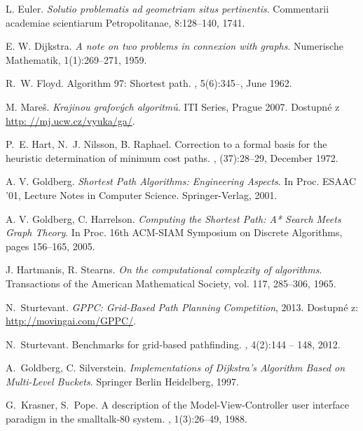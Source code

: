 
\def\bibname{Zoznam použitej literatúry}
\begin{thebibliography}{99}
\addcontentsline{toc}{chapter}{\bibname}

	L. Euler. 
	\emph{Solutio problematis ad geometriam situs pertinentis}.
    Commentarii academiae scientiarum Petropolitanae, 8:128–140, 1741.

  E. W. Dijkstra.
  \emph{A note on two problems in connexion with graphs}.
  Numerische Mathematik, 1(1):269--271, 1959.

R.~W. Floyd.
\newblock Algorithm 97: Shortest path.
, 5(6):345--, June 1962.



  M. Mareš.
  \emph{Krajinou grafových algoritmů}.
  ITI Series, Prague 2007. Dostupné z \url{http:
  //mj.ucw.cz/vyuka/ga/}.
  
P.~E. Hart, N.~J. Nilsson, B. Raphael.
\newblock Correction to a formal basis for the heuristic determination of minimum cost paths.
, (37):28--29, December 1972.

A. V. Goldberg. 
\emph{Shortest Path Algorithms: Engineering Aspects}. 
In Proc. ESAAC '01, Lecture Notes in
Computer Science. Springer-Verlag, 2001.


A. V. Goldberg, C. Harrelson. 
\emph{Computing the Shortest Path: A* Search Meets Graph Theory}.
In Proc. 16th ACM-SIAM Symposium on Discrete Algorithms, pages 156--165, 2005.

 J. Hartmanis, R. Stearns. 
 \emph{On the computational complexity of algorithms}. 
 Transactions of the American Mathematical Society, vol. 117, 285--306, 1965.

  N.~Sturtevant.
  \emph{GPPC: Grid-Based Path Planning Competition}, 2013.
  Dostupné z: \url{http://movingai.com/GPPC/}. 
   
N.~Sturtevant.
\newblock Benchmarks for grid-based pathfinding.
,
  4(2):144 -- 148, 2012.
   
A.~Goldberg, C. Silverstein.
\emph{Implementations of Dijkstra’s Algorithm Based on Multi-Level Buckets}.
Springer Berlin Heidelberg,
1997.

G.~Krasner, S.~Pope.
\newblock A description of the {Model-View-Controller} user interface paradigm
  in the smalltalk-80 system.
, 1(3):26--49, 1988.



\end{thebibliography}
